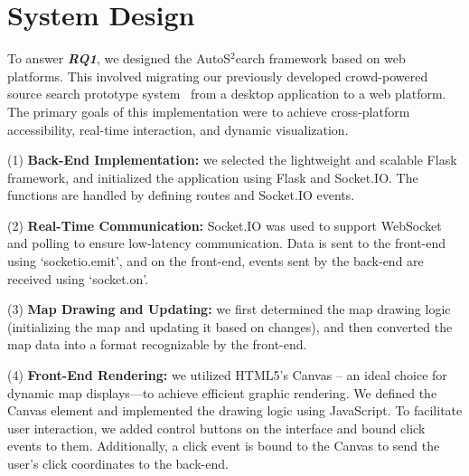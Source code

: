 \section{System Design}
To answer \textbf{\textit{RQ1}}, we designed the AutoS$^2$earch framework based on web platforms. This involved migrating our previously developed crowd-powered source search prototype system~\cite{zhao2022crowd} from a desktop application to a web platform. The primary goals of this implementation were to achieve cross-platform accessibility, real-time interaction, and dynamic visualization.

(1) \textbf{Back-End Implementation:} we selected the lightweight and scalable Flask framework, and initialized the application using Flask and Socket.IO. The functions are handled by defining routes and Socket.IO events.


(2) \textbf{Real-Time Communication:} Socket.IO was used to support WebSocket and polling to ensure low-latency communication. Data is sent to the front-end using `socketio.emit', and on the front-end, events sent by the back-end are received using `socket.on'.

(3) \textbf{Map Drawing and Updating:} we first determined the map drawing logic (initializing the map and updating it based on changes), and then converted the map data into a format recognizable by the front-end.

(4) \textbf{Front-End Rendering:} we utilized HTML5's Canvas -- an ideal choice for dynamic map displays—to achieve efficient graphic rendering. We defined the Canvas element and implemented the drawing logic using JavaScript. To facilitate user interaction, we added control buttons on the interface and bound click events to them. Additionally, a click event is bound to the Canvas to send the user's click coordinates to the back-end.

